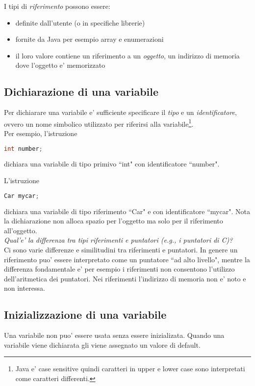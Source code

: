 \documentclass{article}
\begin{document}
I tipi di \emph{riferimento} possono essere:
\begin{itemize}
\item definite dall'utente (o in specifiche librerie)
\item fornite da Java per esempio array e enumerazioni
\item il loro valore contiene un riferimento a un \emph{oggetto}, un indirizzo di memoria dove l'oggetto e' memorizzato
\end{itemize}



\subsection{Dichiarazione di una variabile}
Per dichiarare una variabile e' sufficiente specificare il \emph{tipo} e un \emph{identificatore}, ovvero un nome simbolico utilizzato per riferirsi alla variabile\footnote{Java e' case sensitive quindi caratteri in upper e lower case sono interpretati come caratteri differenti.}. \\
Per esempio, l'istruzione
\begin{lstlisting}[language=Java,escapechar=|]
int number;
\end{lstlisting}
dichiara una variabile di tipo primivo ``int" con identificatore ``number".

L'istruzione
\begin{lstlisting}[language=Java,escapechar=|]
Car mycar;
\end{lstlisting}
dichiara una variabile di tipo riferimento ``Car" e con identificatore ``mycar". Nota la dichiarazione non alloca spazio per l'oggetto ma solo per il riferimento all'oggetto. \\

\emph{Qual'e' la differenza tra tipi riferimenti e puntatori (e.g., i puntatori di C)?}\\
Ci sono varie differenze e similitudini tra riferimenti e puntatori. In genere un riferimento puo' essere interpretato come un puntatore ``ad alto livello", mentre la differenza fondamentale e' per esempio i riferimenti non consentono l'utilizzo dell'aritmetica dei puntatori. Nei riferimenti l'indirizzo di memoria non e' noto e non interessa.

\subsection{Inizializzazione di una variabile}
Una variabile non puo' essere usata senza essere inizializata. Quando una variabile viene dichiarata gli viene assegnato un valore di default.
\end{document}
